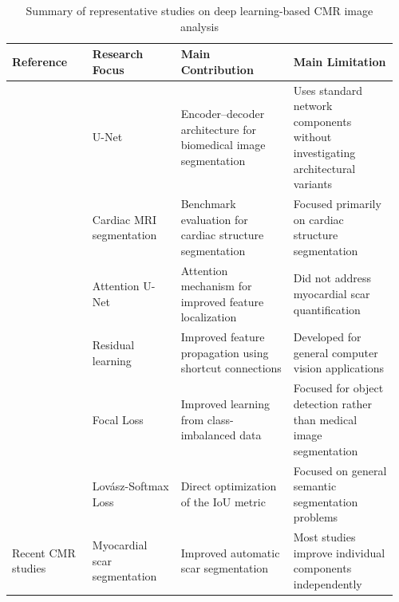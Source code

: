 \begin{landscape}
	\begin{table}[htbp]
		\centering
		\caption{Summary of representative studies on deep learning-based CMR image analysis}
		\label{tab:related-studies}
		
		\small
		\renewcommand{\arraystretch}{1.3}
		\begin{tabular}{
				>{\raggedright\arraybackslash}p{0.20\linewidth}
				>{\raggedright\arraybackslash}p{0.22\linewidth}
				>{\raggedright\arraybackslash}p{0.28\linewidth}
				>{\raggedright\arraybackslash}p{0.26\linewidth}
			}
			\toprule
			\textbf{Reference} & \textbf{Research Focus} & \textbf{Main Contribution} & \textbf{Main Limitation} \\ \midrule
			
			\cite{Ronneberger2015} & 
			U-Net & 
			Encoder--decoder architecture for biomedical image segmentation & 
			Uses standard network components without investigating architectural variants \\ \addlinespace
			
			\cite{Bernard2018} & 
			Cardiac MRI segmentation & 
			Benchmark evaluation for cardiac structure segmentation & 
			Focused primarily on cardiac structure segmentation \\ \addlinespace
			
			\cite{Oktay2018} & 
			Attention U-Net & 
			Attention mechanism for improved feature localization & 
			Did not address myocardial scar quantification \\ \addlinespace
			
			\cite{Ma2021} & 
			Residual learning & 
			Improved feature propagation using shortcut connections & 
			Developed for general computer vision applications \\ \addlinespace
			
			\cite{Lin2017} & 
			Focal Loss & 
			Improved learning from class-imbalanced data & 
			Focused for object detection rather than medical image segmentation \\ \addlinespace
			
			\cite{Berman2018} & 
			Lov\'asz-Softmax Loss & 
			Direct optimization of the IoU metric & 
			Focused on general semantic segmentation problems \\ \addlinespace
			
			Recent CMR studies & 
			Myocardial scar segmentation & 
			Improved automatic scar segmentation & 
			Most studies improve individual components independently \\
			\bottomrule
		\end{tabular}
	\end{table}
\end{landscape}

